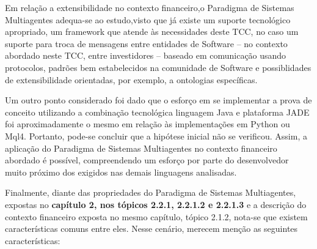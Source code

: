 Em relação a extensibilidade no contexto financeiro,o Paradigma de Sistemas Multiagentes adequa-se ao estudo,visto que já existe um suporte tecnológico apropriado, um framework que atende às necessidades deste TCC, no caso um suporte para troca de mensagens entre entidades de Software – no contexto abordado neste TCC, entre investidores – baseado em comunicação usando protocolos, padrões bem estabelecidos na comunidade de Software e possiblidades de extensibilidade orientadas, por exemplo, a ontologias específicas.

Um outro ponto considerado foi dado que o esforço em se implementar a prova de conceito utilizando a combinação tecnológica linguagem Java e plataforma JADE foi aproximadamente o mesmo em relação às implementações em Python ou Mql4. Portanto, pode-se concluir que a hipótese inicial não se verificou. Assim, a aplicação do Paradigma de Sistemas Multiagentes no contexto financeiro abordado é possível, compreendendo um esforço por parte do desenvolvedor muito próximo dos exigidos nas demais linguagens analisadas.

Finalmente, diante das propriedades do Paradigma de Sistemas Multiagentes, expostas no \textbf{capítulo 2, nos tópicos 2.2.1, 2.2.1.2 e 2.2.1.3} e a descrição do contexto financeiro exposta no mesmo capítulo, tópico 2.1.2, nota-se que existem características comuns entre eles. Nesse cenário, merecem menção as seguintes características:

